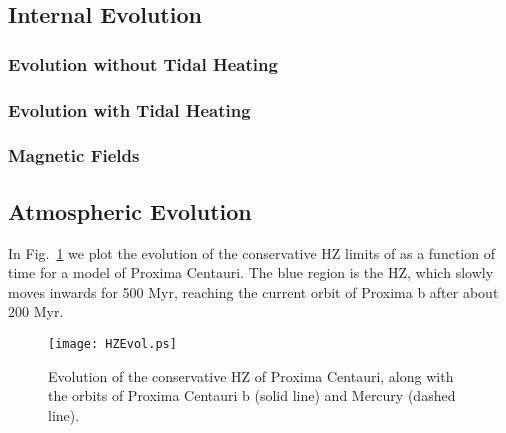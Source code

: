 \documentclass[preprint,12pt]{aastex}
\begin{document}

\subsection{Internal Evolution}
\label{sec:results:internal}

\subsubsection{Evolution without Tidal Heating}
\label{sec:results:internal:notides}



\subsubsection{Evolution with Tidal Heating}
\label{sec:results:internal:tides}




\subsubsection{Magnetic Fields}
\label{sec:results:magnetic}


\subsection{Atmospheric Evolution}
\label{sec:results:atmesc}

In Fig.~\ref{fig:HZEvol} we plot the evolution of the conservative HZ limits of \cite{Kopparapu13} as a function of time for a model of Proxima Centauri. The blue region is the HZ, which slowly moves inwards for 500 Myr, reaching the current orbit of Proxima b after about 200 Myr.

\begin{figure} 
\begin{center}
\texttt{[image: HZEvol.ps]}
\end{center}
\caption{Evolution of the conservative HZ of Proxima Centauri, along with the orbits of Proxima Centauri b (solid line) and Mercury (dashed line).}
\label{fig:HZEvol}
\end{figure}
\end{document}

